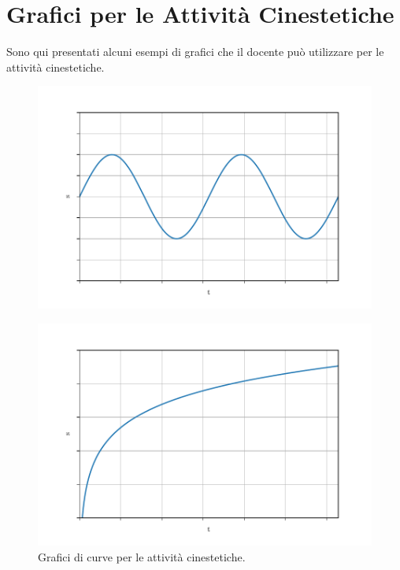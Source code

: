 \documentclass{report} \usepackage[T1]{fontenc} \usepackage[italian]{babel}
\begin{document}
\appendix
\chapter{Grafici per le Attività Cinestetiche}\label{appendix_kine}
Sono qui presentati alcuni esempi di grafici che il docente può
utilizzare per le attività cinestetiche.

\begin{figure}[H]
\centering
  \includegraphics[width=\textwidth]{kine_plot4}
  \label{fig:kine_plot4}
\end{figure}

\begin{figure}[H]
\centering
  \includegraphics[width=\textwidth]{kine_plot5}
  \caption{Grafici di curve per le attività
           cinestetiche.}
  \label{fig:kine_plot5}
\end{figure}
\end{document}
